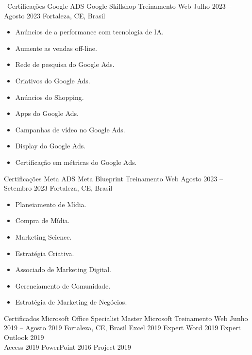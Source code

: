 \begin{commentA}
\cvevent
	{%
		\faGoogle\ Certificações Google ADS%
		\quad%
		\hrulefill%
		}
	{Google Skillshop \hfill \faEdge Treinamento Web}
	{Julho 2023 -- Agosto 2023}
	{Fortaleza, CE, Brasil}
\vspace{-0.5em}
\begin{multicols}{2}
	\begin{itemize}[leftmargin=*,itemsep=0.5em,topsep=0.5em]
		\item Anúncios de a performance com tecnologia de IA.
		\item Aumente as vendas off-line.
		\item Rede de pesquisa do Google Ads.
		\item Criativos do Google Ads.
		\item Anúncios do Shopping.
		\item Apps do Google Ads.
		\item Campanhas	de vídeo no Google Ads.
		\item Display do Google Ads.
		\item Certificação em métricas do Google Ads.
	\end{itemize}
\end{multicols}
\cvevent
	{\faFacebook  Certificações Meta ADS%
		\quad%
		\hrulefill%
		}
	{Meta Blueprint \hfill \faEdge Treinamento Web}
	{Agosto 2023 -- Setembro 2023}
	{Fortaleza, CE, Brasil}
\vspace{-0.5em}
\begin{multicols}{2}
	\begin{itemize}[leftmargin=*,itemsep=0.5em,topsep=0.5em]
		\item Planeiamento de Mídia.
		\item Compra de Mídia.
		\item Marketing Science.
		\item Estratégia Criativa.
		\item Associado de Marketing Digital.
		\item Gerenciamento de Comunidade.
		\item Estratégia de Marketing de Negócios.
	\end{itemize}
\end{multicols}
\cvevent
{\faMicrosoft Certificados Microsoft Office Specialist Master}
{Microsoft \hfill \faEdge Treinamento Web%
		\quad%
		\hrulefill%
		}
{Junho 2019 -- Agosto 2019}
{Fortaleza, CE, Brasil}
\cvtag
{\footnotesize\faFileExcel[regular] Excel 2019 Expert}
\cvtag
{\footnotesize\faFileWord[regular] Word 2019 Expert}
\cvtag
{\footnotesize Outlook 2019} \\
\cvtag
{\footnotesize\faDatabase Access 2019}
\cvtag
{\footnotesize\faFilePowerpoint[regular] PowerPoint 2016}
\cvtag
{\footnotesize Project 2019}
\end{commentA}
